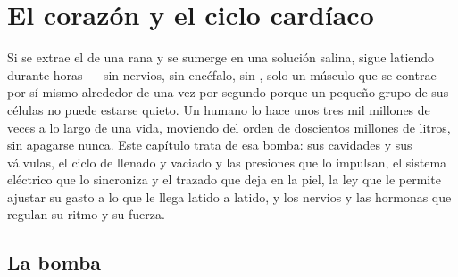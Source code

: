 \chapter{El corazón y el ciclo cardíaco}\label{ch:b2:heart}

Si se extrae el  de una rana y se sumerge en una solución salina,
sigue latiendo durante horas --- sin nervios, sin encéfalo, sin ,
solo un músculo que se contrae por sí mismo alrededor de una vez por
segundo porque un pequeño grupo de sus células no puede estarse quieto.
Un  humano lo hace unos tres mil millones de veces a lo largo de
una vida, moviendo del orden de doscientos millones de litros, sin
apagarse nunca. Este capítulo trata de esa bomba: sus cavidades y sus
válvulas, el ciclo de llenado y vaciado y las presiones que lo impulsan,
el sistema eléctrico que lo sincroniza y el trazado que deja en la piel,
la ley que le permite ajustar su gasto a lo que le llega latido a latido,
y los nervios y las hormonas que regulan su ritmo y su fuerza.

\section{La bomba}

